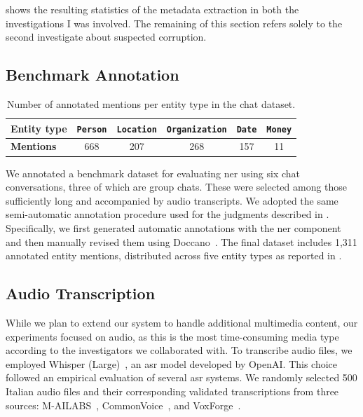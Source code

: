  shows the resulting statistics of the metadata extraction in both the investigations I was involved. The remaining of this section refers solely to the second investigate about suspected corruption.


\subsection{Benchmark Annotation}
\label{sec:wise_dataset}

\begin{table}[h]
\centering
\caption{Number of annotated mentions per entity type in the chat dataset.}
\begin{tabulary}{\textwidth}{LCCCCC}
\toprule
\textbf{Entity type} & \texttt{Person} & \texttt{Location} & \texttt{Organization} & \texttt{Date} & \texttt{Money} \\
\midrule
\textbf{Mentions} & 668 & 207 & 268 & 157 & 11 \\
\bottomrule
\end{tabulary}
\label{tab:chat_ner_stats}
\end{table}

We annotated a benchmark dataset for evaluating \ac{ner} using six chat conversations, three of which are group chats. These were selected among those sufficiently long and accompanied by audio transcripts. We adopted the same semi-automatic annotation procedure used for the judgments described in . Specifically, we first generated automatic annotations with the \ac{ner} component and then manually revised them using Doccano~\cite{doccano}.
The final dataset includes 1,311 annotated entity mentions, distributed across five entity types as reported in .


\subsection{Audio Transcription} \label{sec:wise_multimedia}



While we plan to extend our system to handle additional multimedia content, our experiments focused on audio, as this is the most time-consuming media type according to the investigators we collaborated with.  
To transcribe audio files, we employed Whisper (Large)~\cite{radford23a-whisper}, an \ac{asr} model developed by OpenAI. This choice followed an empirical evaluation of several \ac{asr} systems. We randomly selected 500 Italian audio files and their corresponding validated transcriptions from three sources: M-AILABS~\cite{m-ailabs_dataset}, CommonVoice~\cite{ardila-etal-2020-common}, and VoxForge~\cite{voxforge}.  

